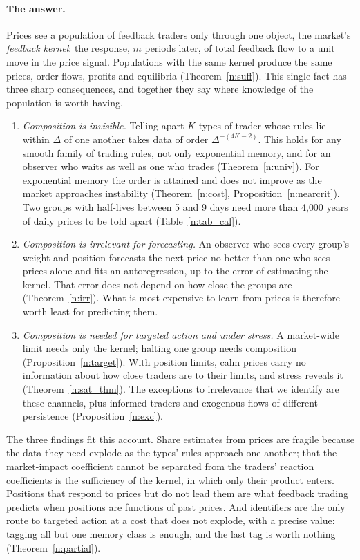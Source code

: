 \paragraph{The answer.} Prices see a population of feedback traders only through one object, the market's \emph{feedback kernel}: the response, $m$ periods later, of total feedback flow to a unit move in the price signal. Populations with the same kernel produce the same prices, order flows, profits and equilibria (Theorem~\ref{n:suff}). This single fact has three sharp consequences, and together they say where knowledge of the population is worth having.
\begin{enumerate}[label=(\alph*),leftmargin=*,itemsep=2pt]
\item \emph{Composition is invisible.} Telling apart $K$ types of trader whose rules lie within $\Delta$ of one another takes data of order $\Delta^{-(4K-2)}$. This holds for any smooth family of trading rules, not only exponential memory, and for an observer who waits as well as one who trades (Theorem~\ref{n:univ}). For exponential memory the order is attained and does not improve as the market approaches instability (Theorem~\ref{n:cost}, Proposition~\ref{n:nearcrit}). Two groups with half-lives between 5 and 9 days need more than 4{,}000 years of daily prices to be told apart (Table~\ref{n:tab_cal}).
\item \emph{Composition is irrelevant for forecasting.} An observer who sees every group's weight and position forecasts the next price no better than one who sees prices alone and fits an autoregression, up to the error of estimating the kernel. That error does not depend on how close the groups are (Theorem~\ref{n:irr}). What is most expensive to learn from prices is therefore worth least for predicting them.
\item \emph{Composition is needed for targeted action and under stress.} A market-wide limit needs only the kernel; halting one group needs composition (Proposition~\ref{n:target}). With position limits, calm prices carry no information about how close traders are to their limits, and stress reveals it (Theorem~\ref{n:sat_thm}). The exceptions to irrelevance that we identify are these channels, plus informed traders and exogenous flows of different persistence (Proposition~\ref{n:exc}).
\end{enumerate}
The three findings fit this account. Share estimates from prices are fragile because the data they need explode as the types' rules approach one another; that the market-impact coefficient cannot be separated from the traders' reaction coefficients \citep{lux2018} is the sufficiency of the kernel, in which only their product enters. Positions that respond to prices but do not lead them are what feedback trading predicts when positions are functions of past prices. And identifiers are the only route to targeted action at a cost that does not explode, with a precise value: tagging all but one memory class is enough, and the last tag is worth nothing (Theorem~\ref{n:partial}).

